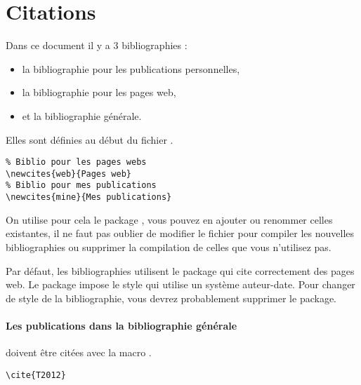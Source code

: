 \section{Citations}

Dans ce document il y a 3 bibliographies :
\begin{itemize}
  \item la bibliographie pour les publications personnelles,
  \item la bibliographie pour les pages web,
  \item et la bibliographie générale.
\end{itemize}

Elles sont définies au début du fichier .

\begin{framed}\vspace{-0.75em}
\begin{verbatim}
% Biblio pour les pages webs
\newcites{web}{Pages web}
% Biblio pour mes publications
\newcites{mine}{Mes publications}
\end{verbatim}\vspace{-0.75em}
\end{framed}

On utilise pour cela le package , vous pouvez en ajouter ou renommer celles existantes, il ne faut pas oublier de modifier le fichier  pour compiler les nouvelles bibliographies ou supprimer la compilation de celles que vous n'utilisez pas.

Par défaut, les bibliographies utilisent le package qui cite correctement des pages web.
Le package impose le style  qui utilise un système auteur-date.
Pour changer de style de la bibliographie, vous devrez probablement supprimer le package.

\paragraph{Les publications dans la bibliographie générale} doivent être citées avec la macro .

\begin{framed}
\noindent\cite{T2012}\vspace{-0.75em}
\begin{verbatim}\cite{T2012}\end{verbatim}\vspace{-0.75em}
\end{framed}

